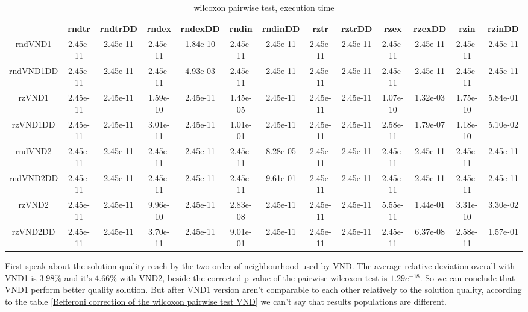 \documentclass[12pt,a4paper]{article}
\begin{document}
\begin{table}[!h]
\leftskip -2.1cm
{
\scriptsize
\begin{tabular}{|*{13}{c|}}
  \hline
& rndtr & rndtrDD & rndex & rndexDD & rndin & rndinDD & rztr & rztrDD & rzex & rzexDD & rzin & rzinDD \\
\hline
rndVND1 & 2.45e-11 & 2.45e-11 & 2.45e-11 & 1.84e-10 & 2.45e-11 & 2.45e-11 & 2.45e-11 & 2.45e-11 & 2.45e-11 & 2.45e-11 & 2.45e-11 & 2.45e-11 \\
rndVND1DD & 2.45e-11 & 2.45e-11 & 2.45e-11 & 4.93e-03 & 2.45e-11 & 2.45e-11 & 2.45e-11 & 2.45e-11 & 2.45e-11 & 2.45e-11 & 2.45e-11 & 2.45e-11 \\
rzVND1 & 2.45e-11 & 2.45e-11 & 1.59e-10 & 2.45e-11 & 1.45e-05 & 2.45e-11 & 2.45e-11 & 2.45e-11 & 1.07e-10 & 1.32e-03 & 1.75e-10 & 5.84e-01 \\
rzVND1DD & 2.45e-11 & 2.45e-11 & 3.01e-11 & 2.45e-11 & 1.01e-01 & 2.45e-11 & 2.45e-11 & 2.45e-11 & 2.58e-11 & 1.79e-07 & 1.18e-10 & 5.10e-02 \\
rndVND2 & 2.45e-11 & 2.45e-11 & 2.45e-11 & 2.45e-11 & 2.45e-11 & 8.28e-05 & 2.45e-11 & 2.45e-11 & 2.45e-11 & 2.45e-11 & 2.45e-11 & 2.45e-11 \\
rndVND2DD & 2.45e-11 & 2.45e-11 & 2.45e-11 & 2.45e-11 & 2.45e-11 & 9.61e-01 & 2.45e-11 & 2.45e-11 & 2.45e-11 & 2.45e-11 & 2.45e-11 & 2.45e-11 \\
rzVND2 & 2.45e-11 & 2.45e-11 & 9.96e-10 & 2.45e-11 & 2.83e-08 & 2.45e-11 & 2.45e-11 & 2.45e-11 & 5.55e-11 & 1.44e-01 & 3.31e-10 & 3.30e-02 \\
rzVND2DD & 2.45e-11 & 2.45e-11 & 3.70e-11 & 2.45e-11 & 9.01e-01 & 2.45e-11 & 2.45e-11 & 2.45e-11 & 2.45e-11 & 6.37e-08 & 2.58e-11 & 1.57e-01 \\
  \hline
\end{tabular}
\normalsize
}
\caption{wilcoxon pairwise test, execution time}
\label{wilcoxon pairwise test VND-single neighbourhood time}
\end{table} 
 
 
First speak about the solution quality reach by the two order of neighbourhood used by VND. The average relative deviation overall with VND1 is $3.98 \%$ and it's $4.66 \%$ with VND2, beside the corrected p-value of the pairwise wilcoxon test is $1.29e^{-18}$. So we can conclude that VND1 perform better quality solution. But after VND1 version aren't comparable to each other relatively to the solution quality, according to the table \ref{Befferoni correction of the wilcoxon pairwise test VND} we can't say that results populations are different.
\end{document}

